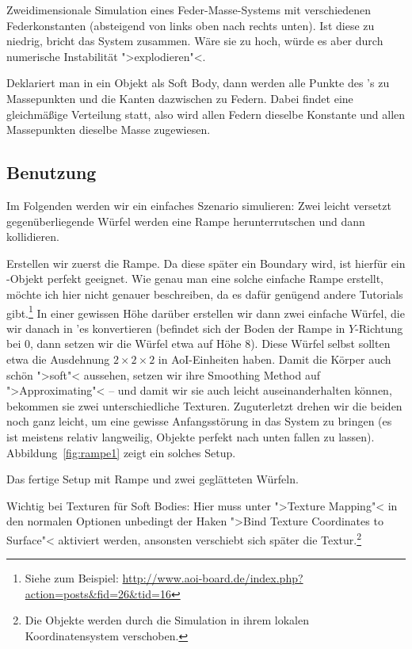 \documentclass[10pt,DIV=14,a4paper]{scrartcl}
\begin{document}
{Zweidimensionale Simulation eines Feder-Masse-Systems mit verschiedenen
Federkonstanten (absteigend von links oben nach rechts unten). Ist diese
zu niedrig, bricht das System zusammen. Wäre sie zu hoch, würde es aber
durch numerische Instabilität ">explodieren"<.}

Deklariert man in \aoi ein Objekt als Soft Body, dann werden alle
Punkte des \TriMesh's zu Massepunkten und die Kanten dazwischen zu
Federn. Dabei findet eine gleichmäßige Verteilung statt, also wird allen
Federn dieselbe Konstante und allen Massepunkten dieselbe Masse
zugewiesen.

\subsection{Benutzung}
Im Folgenden werden wir ein einfaches Szenario simulieren: Zwei leicht
versetzt gegenüberliegende Würfel werden eine Rampe herunterrutschen und
dann kollidieren.

Erstellen wir zuerst die Rampe. Da diese später ein Boundary wird, ist
hierfür ein \PolyMesh-Objekt perfekt geeignet. Wie genau man eine solche
einfache Rampe erstellt, möchte ich hier nicht genauer beschreiben, da
es dafür genügend andere Tutorials gibt.\footnote{Siehe zum Beispiel:
\url{http://www.aoi-board.de/index.php?action=posts&fid=26&tid=16}} In
einer gewissen Höhe darüber erstellen wir dann zwei einfache Würfel, die
wir danach in \TriMesh'es konvertieren (befindet sich der Boden der
Rampe in $Y$-Richtung bei $0$, dann setzen wir die Würfel etwa auf Höhe
$8$). Diese Würfel selbst sollten etwa die Ausdehnung $2 \times 2 \times
2$ in AoI-Einheiten haben. Damit die Körper auch schön ">soft"<
aussehen, setzen wir ihre Smoothing Method auf ">Approximating"< -- und
damit wir sie auch leicht auseinanderhalten können, bekommen sie zwei
unterschiedliche Texturen.  Zuguterletzt drehen wir die beiden noch ganz
leicht, um eine gewisse Anfangsstörung in das System zu bringen (es ist
meistens relativ langweilig, Objekte perfekt nach unten fallen zu
lassen). Abbildung~\ref{fig:rampe1} zeigt ein solches Setup.

{Das fertige Setup mit Rampe und zwei geglätteten Würfeln.}

Wichtig bei Texturen für Soft Bodies: Hier muss unter ">Texture
Mapping"< in den normalen \aoi Optionen unbedingt der Haken ">Bind
Texture Coordinates to Surface"< aktiviert werden, ansonsten verschiebt
sich später die Textur.\footnote{Die Objekte werden durch die Simulation
in ihrem lokalen Koordinatensystem verschoben.}
\end{document}
